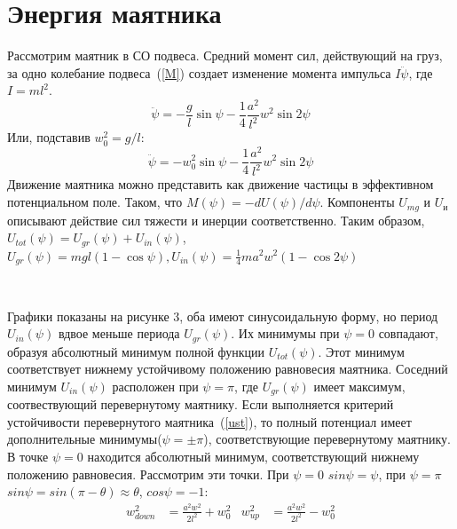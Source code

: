 \documentclass[a4paper,12pt]{article}
\begin{document}
\section{Энергия маятника}
Рассмотрим маятник в СО подвеса. Средний момент сил, действующий на груз, за одно колебание подвеса~(\ref{M}) создает изменение момента импульса $I\ddot{\psi}$, где $I = ml^2$.
\begin{equation}
\label{f2}
\ddot{\psi} = -\frac{g}{l}\sin{\psi} - \frac{1}{4}\frac{a^2}{l^2}w^2\sin{2\psi}
\end{equation}
Или, подставив $w_0^2 = g/l$:
\begin{equation}
\ddot{\psi} = -w_0^2\sin{\psi} - 	\frac{1}{4}\frac{a^2}{l^2}w^2\sin{2\psi}
\end{equation}
Движение маятника можно представить как движение частицы в эффективном потенциальном поле. Таком, что $M(\psi) = -dU(\psi)/d\psi$. Компоненты $U_{mg}$ и $U_и$ описывают действие сил тяжести и инерции соответственно. Таким образом, $U_{tot}(\psi) = U_{gr}(\psi) + U_{in}(\psi)$,
$U_{gr}(\psi) = mgl(1-\cos{\psi}), U_{in}(\psi) = \frac{1}{4}ma^2w^2(1-\cos{2\psi})$\\
\begin{figure}
	\vspace{-7ex}
	\\
\end{figure}
Графики показаны на рисунке 3, оба имеют синусоидальную форму, но период $U_{in}(\psi)$ вдвое меньше периода $U_{gr}(\psi)$. Их минимумы при $\psi = 0 $ совпадают, образуя абсолютный минимум полной функции $U_{tot}(\psi)$. Этот минимум соответствует нижнему устойчивому положению равновесия маятника. Соседний минимум $U_{in}(\psi)$ расположен при $\psi = \pi$, где $U_{gr}(\psi)$ имеет максимум, соотвествующий перевернутому маятнику.
Если выполняется критерий устойчивости перевернутого маятника~(\ref{ust}), то полный потенциал имеет дополнительные минимумы($\psi = \pm\pi$), соответствующие перевернутому маятнику. В точке $\psi = 0$ находится абсолютный минимум, соответствующий нижнему положению равновесия. Рассмотрим эти точки. При $\psi = 0$ $sin\psi = \psi$, при $\psi = \pi$ $sin\psi = sin(\pi - \theta) \approx \theta$, $cos\psi = -1$:
\begin{align}
w_{down}^2 &= \frac{a^2w^2}{2l^2} + w_0^2 & w_{up}^2 &= \frac{a^2w^2}{2l^2} - w_0^2
\end{align}
\end{document}
